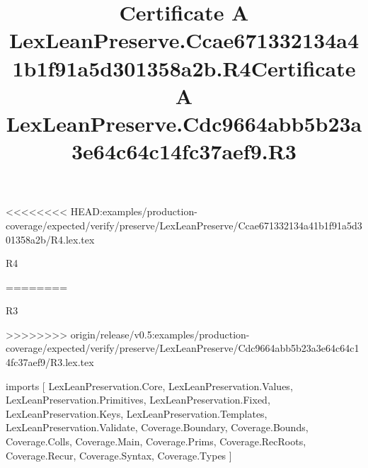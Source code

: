 <<<<<<<< HEAD:examples/production-coverage/expected/verify/preserve/LexLeanPreserve/Ccae671332134a41b1f91a5d301358a2b/R4.lex.tex
\begin{lexlean}{R4}
\title{Certificate A LexLeanPreserve.Ccae671332134a41b1f91a5d301358a2b.R4}
========
\begin{lexlean}{R3}
\title{Certificate A LexLeanPreserve.Cdc9664abb5b23a3e64c64c14fc37aef9.R3}
>>>>>>>> origin/release/v0.5:examples/production-coverage/expected/verify/preserve/LexLeanPreserve/Cdc9664abb5b23a3e64c64c14fc37aef9/R3.lex.tex
\begin{coremodule}
imports [
  LexLeanPreservation.Core,
  LexLeanPreservation.Values,
  LexLeanPreservation.Primitives,
  LexLeanPreservation.Fixed,
  LexLeanPreservation.Keys,
  LexLeanPreservation.Templates,
  LexLeanPreservation.Validate,
  Coverage.Boundary,
  Coverage.Bounds,
  Coverage.Colls,
  Coverage.Main,
  Coverage.Prims,
  Coverage.RecRoots,
  Coverage.Recur,
  Coverage.Syntax,
  Coverage.Types
]


\end{coremodule}
\end{lexlean}
\end{lexlean}
